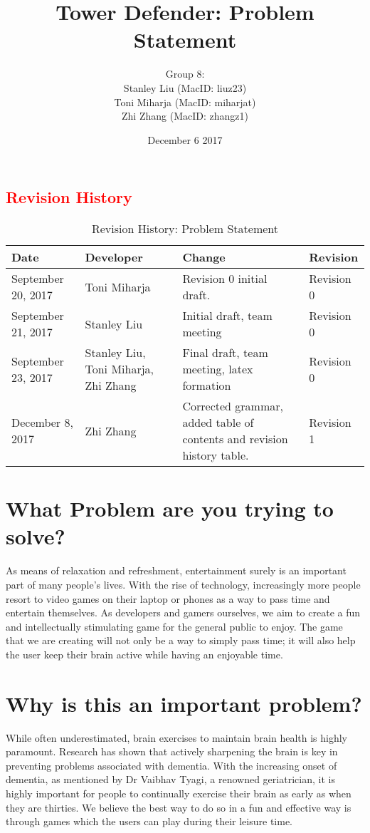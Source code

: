 \documentclass[12pt]{article}
\title{Tower Defender: Problem Statement}
\author{Group 8: \\
                 Stanley Liu (MacID: liuz23) \\    
                 Toni Miharja (MacID: miharjat)\\
                 Zhi Zhang (MacID: zhangz1)}
\date{December 6 2017 }
\begin{document}
\maketitle
\newpage
\textcolor{red}{\tableofcontents}
\newpage

\textcolor{red}{\section{Revision History}}
\begin{table}[h!]
    \centering
    \textcolor{red}{
    \begin{tabular}{|p{2.5cm}|p{3cm}|p{3cm}|p{2cm}|}
    \hline
    \textbf {Date}  & {Developer} & {Change} & {Revision} \\
    \hline
    September 20, 2017 & Toni Miharja & Revision 0 initial draft. & Revision 0\\
    \hline
    September 21, 2017  & Stanley Liu & Initial draft, team meeting & Revision 0\\
    \hline
    September 23, 2017  & Stanley Liu, Toni Miharja, Zhi Zhang & Final draft, team meeting, latex formation & Revision 0 \\
    \hline
    December 8, 2017  & Zhi Zhang & Corrected grammar, added table of contents and revision history table. & Revision 1 \\
    \hline
    \end{tabular}}
    \textcolor{red}{\caption{Revision History: Problem Statement}}
\end{table}

\newpage

\section {What Problem are you trying to solve?}
As means of relaxation and refreshment, entertainment surely is an important part of many people’s lives. With the rise of technology, increasingly more people resort to video games on their laptop or phones as a way to pass time and entertain themselves. As developers and gamers ourselves, we aim to create a fun and intellectually stimulating game for the general public to enjoy. The game that we are creating will not only be a way to simply pass time; it will also help the user keep their brain active while having an enjoyable time. 

\section {Why is this an important problem?}
While often underestimated, brain exercises to maintain brain health is highly paramount. Research has shown that actively sharpening the brain is key in preventing problems associated with dementia. With the increasing onset of dementia, as mentioned by Dr Vaibhav Tyagi, a renowned geriatrician, it is highly important for people to continually exercise their brain as early as when they are thirties. We believe the best way to do so in a fun and effective way is through games which the users can play during their leisure time.
\end{document}
